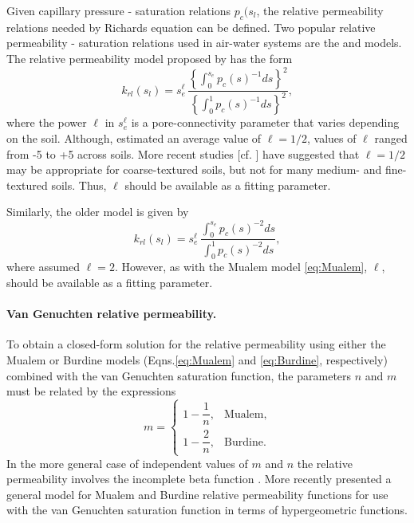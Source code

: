 Given capillary pressure - saturation relations $p_c(s_l$, 
the relative permeability relations needed by Richards equation can be defined.  
Two popular relative permeability - saturation relations used in air-water 
systems are the \citet{mualem1976new} and \citet{burdine1953relative} models.
The relative permeability model proposed by \citet{mualem1976new} has the form
\begin{equation} \label{eq:Mualem}
  k_{rl}(s_l) 
  = 
  s_e^{\ell} \, 
  \frac{ \left\{ \displaystyle\int_0^{s_e} p_c(s)^{-1} ds \right\}^2 }
  { \left\{ \displaystyle\int_0^{1} p_c(s)^{-1} ds \right\}^2 },
\end{equation}
where the power $\ell$ in $s_e^\ell$ is a pore-connectivity parameter that varies 
depending on the soil. 
Although, \citet{mualem1976new} estimated an average value of
$\ell=1/2$, values of $\ell$ ranged from -5 to +5 across soils. More recent studies
[cf. \citet{vanG_retc_1991}] have suggested that $\ell=1/2$ may be
appropriate for coarse-textured soils, but not for many medium- and
fine-textured soils. Thus, $\ell$ should be available as a fitting parameter.

Similarly, the older \citet{burdine1953relative} model is given by
\begin{equation}
\label{eq:Burdine}
  k_{rl}(s_l) = s_e^{\ell} \, 
    \frac{ \displaystyle\int_0^{s_e} p_c(s)^{-2} ds }
         { \displaystyle\int_0^{1} p_c(s)^{-2} ds },
\end{equation}
where \citet{burdine1953relative} assumed $\ell=2$. However, as with
the Mualem model \eqref{eq:Mualem}, $\ell$, should be available as a
fitting parameter.


\paragraph{Van Genuchten relative permeability.}
To obtain a closed-form solution for the relative permeability using
either the Mualem or Burdine models (Eqns.\eqref{eq:Mualem} and
\eqref{eq:Burdine}, respectively) combined with the van Genuchten
saturation function, the parameters $n$ and $m$ must be related by the
expressions
\begin{equation}
\label{eq:lambda} 
m = \left\{
  \begin{array}{ll}
    1 - \dfrac{1}{n}, & \text{Mualem},\\[9pt]
    1 - \dfrac{2}{n}, & \text{Burdine}.
  \end{array}
\right.
\end{equation}
In the more general case of independent values of $m$ and $n$ the
relative permeability involves the incomplete beta function \citep{vangenuchten1985}. 
More recently \citep{douradoneto2011} presented a general model for Mualem and 
Burdine relative permeability functions for use with the van Genuchten saturation 
function in terms of hypergeometric functions.


